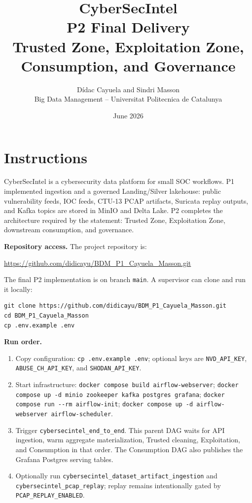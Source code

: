 \documentclass[11pt,a4paper]{article}
\title{\vspace{-1.1cm}CyberSecIntel\\P2 Final Delivery\\Trusted Zone, Exploitation Zone, Consumption, and Governance}
\author{D\'idac Cayuela and Sindri Masson\\Big Data Management -- Universitat Politecnica de Catalunya}
\date{June 2026}
\newcommand{\code}[1]{\nolinkurl{#1}}
\begin{document}
\maketitle
\vspace{-0.85cm}

\section{Instructions}

CyberSecIntel is a cybersecurity data platform for small SOC workflows. P1 implemented ingestion and a governed Landing/Silver lakehouse: public vulnerability feeds, IOC feeds, CTU-13 PCAP artifacts, Suricata replay outputs, and Kafka topics are stored in MinIO and Delta Lake. P2 completes the architecture required by the statement: Trusted Zone, Exploitation Zone, downstream consumption, and governance.

\textbf{Repository access.} The project repository is:
\begin{center}
  \url{https://github.com/didicayu/BDM_P1_Cayuela_Masson.git}
\end{center}
The final P2 implementation is on branch \code{main}. A supervisor can clone and run it locally:
\begin{verbatim}
git clone https://github.com/didicayu/BDM_P1_Cayuela_Masson.git
cd BDM_P1_Cayuela_Masson
cp .env.example .env
\end{verbatim}

\textbf{Run order.}
\begin{enumerate}
  \item Copy configuration: \texttt{cp .env.example .env}; optional keys are \code{NVD_API_KEY}, \code{ABUSE_CH_API_KEY}, and \code{SHODAN_API_KEY}.
  \item Start infrastructure: \texttt{docker compose build airflow-webserver}; \texttt{docker compose up -d minio zookeeper kafka postgres grafana}; \texttt{docker compose run {-}{-}rm airflow-init}; \texttt{docker compose up -d airflow-webserver airflow-scheduler}.
  \item Trigger \code{cybersecintel_end_to_end}. This parent DAG waits for API ingestion, warm aggregate materialization, Trusted cleaning, Exploitation, and Consumption in that order. The Consumption DAG also publishes the Grafana Postgres serving tables.
  \item Optionally run \code{cybersecintel_dataset_artifact_ingestion} and \code{cybersecintel_pcap_replay}; replay remains intentionally gated by \code{PCAP_REPLAY_ENABLED}.
\end{enumerate}
\end{document}
